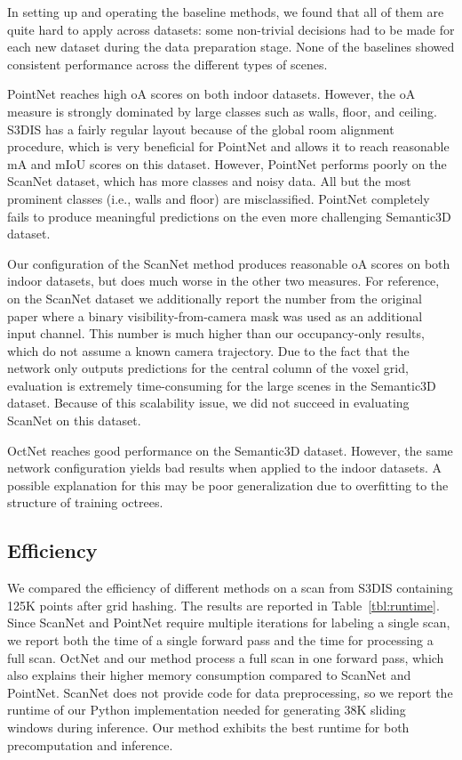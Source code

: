 \documentclass[10pt,twocolumn,letterpaper]{article}
\begin{document}
In setting up and operating the baseline methods, we found that all of them are quite hard to apply across datasets: some non-trivial decisions had to be made for each new dataset during the data preparation stage.
None of the baselines showed consistent performance across the different types of scenes.

PointNet reaches high oA scores on both indoor datasets. However, the oA measure is strongly dominated by large classes such as walls, floor, and ceiling.
S3DIS has a fairly regular layout because of the global room alignment procedure, which is very beneficial for PointNet and allows it to reach reasonable mA and mIoU scores on this dataset.
However, PointNet performs poorly on the ScanNet dataset, which has more classes and noisy data.
All but the most prominent classes (i.e., walls and floor) are misclassified.
PointNet completely fails to produce meaningful predictions on the even more challenging Semantic3D dataset.

Our configuration of the ScanNet method produces reasonable oA scores on both indoor datasets, but does much worse in the other two measures.
For reference, on the ScanNet dataset we additionally report the number from the original paper where a binary visibility-from-camera mask was used as an additional input channel.
This number is much higher than our occupancy-only results, which do not assume a known camera trajectory. Due to the fact that the network only outputs predictions for the central column of the voxel grid, evaluation is extremely time-consuming for the large scenes in the Semantic3D dataset.
Because of this scalability issue, we did not succeed in evaluating ScanNet on this dataset.

OctNet reaches good performance on the Semantic3D dataset.
However, the same network configuration yields bad results when applied to the indoor datasets.
A possible explanation for this may be poor generalization due to overfitting to the structure of training octrees.


\subsection{Efficiency}

We compared the efficiency of different methods on a scan from S3DIS containing 125K points after grid hashing. The results are reported in Table~\ref{tbl:runtime}.
Since ScanNet and PointNet require multiple iterations for labeling a single scan, we report both the time of a single forward pass and the time for processing a full scan.
OctNet and our method process a full scan in one forward pass, which also explains their higher memory consumption compared to ScanNet and PointNet.
ScanNet does not provide code for data preprocessing, so we report the runtime of our Python implementation needed for generating 38K sliding windows during inference.
Our method exhibits the best runtime for both precomputation and inference.
\end{document}
